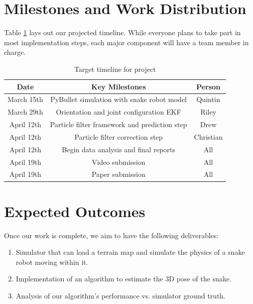\documentclass[letterpaper, 10 pt, conference]{ieeeconf}  %
\begin{document}
\section{Milestones and Work Distribution}
Table \ref{tab:milestones} lays out our projected timeline. While everyone plans to take part in most implementation steps, each major component will have a team member in charge.
\begin{table}[h]
    \centering
    \caption{Target timeline for project}
    \begin{tabular}{|c|c|c|} \hline 
         \textbf{Date}&  \textbf{Key Milestones} & \textbf{Person}\\ \hline 
         March 15th&PyBullet simulation with snake robot model& Quintin\\\hline
         March 29th& Orientation and joint configuration EKF & Riley \\ \hline
         April 12th&Particle filter framework and prediction step & Drew \\ \hline
         April 12th& Particle filter correction step & Christian \\ \hline
         April 12th& Begin data analysis and final reports & All \\ \hline
        April 19th&Video submission & All \\ \hline
        April 19th&Paper submission & All \\ \hline
    \end{tabular}
    \label{tab:milestones}
\end{table}

\section{Expected Outcomes}
Once our work is complete, we aim to have the following deliverables:
\begin{enumerate}
    \item Simulator that can load a terrain map and simulate the physics of a snake robot moving within it.
    \item Implementation of an algorithm to estimate the 3D pose of the snake.
    \item Analysis of our algorithm's performance vs. simulator ground truth.
\end{enumerate}
\end{document}
